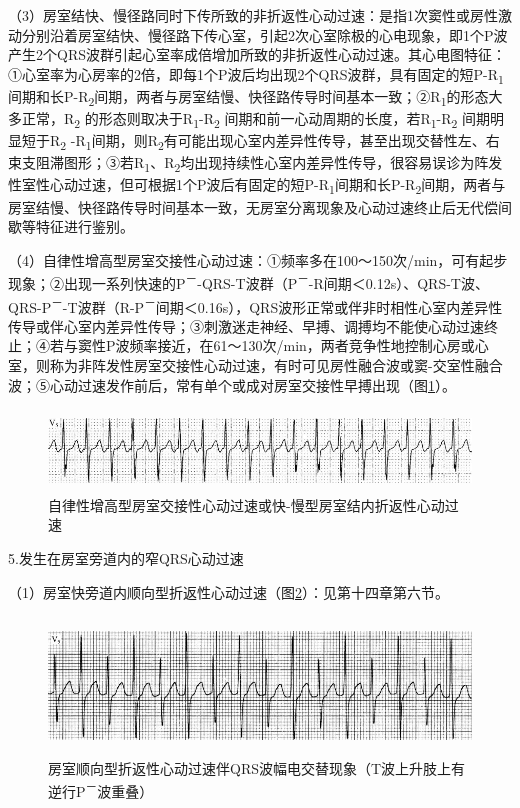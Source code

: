 （3）房室结快、慢径路同时下传所致的非折返性心动过速：是指1次窦性或房性激动分别沿着房室结快、慢径路下传心室，引起2次心室除极的心电现象，即1个P波产生2个QRS波群引起心室率成倍增加所致的非折返性心动过速。其心电图特征：①心室率为心房率的2倍，即每1个P波后均出现2个QRS波群，具有固定的短P-R\textsubscript{1}间期和长P-R\textsubscript{2}间期，两者与房室结慢、快径路传导时间基本一致；②R\textsubscript{1}的形态大多正常，R\textsubscript{2} 的形态则取决于R\textsubscript{1}-R\textsubscript{2} 间期和前一心动周期的长度，若R\textsubscript{1}-R\textsubscript{2} 间期明显短于R\textsubscript{2} -R\textsubscript{1}间期，则R\textsubscript{2}有可能出现心室内差异性传导，甚至出现交替性左、右束支阻滞图形；③若R\textsubscript{1}、R\textsubscript{2}均出现持续性心室内差异性传导，很容易误诊为阵发性室性心动过速，但可根据1个P波后有固定的短P-R\textsubscript{1}间期和长P-R\textsubscript{2}间期，两者与房室结慢、快径路传导时间基本一致，无房室分离现象及心动过速终止后无代偿间歇等特征进行鉴别。

（4）自律性增高型房室交接性心动过速：①频率多在100～150次/min，可有起步现象；②出现一系列快速的P\textsuperscript{－}-QRS-T波群（P\textsuperscript{－}-R间期＜0.12s）、QRS-T波、QRS-P\textsuperscript{－}-T波群（R-P\textsuperscript{－}间期＜0.16s），QRS波形正常或伴非时相性心室内差异性传导或伴心室内差异性传导；③刺激迷走神经、早搏、调搏均不能使心动过速终止；④若与窦性P波频率接近，在61～130次/min，两者竞争性地控制心房或心室，则称为非阵发性房室交接性心动过速，有时可见房性融合波或窦-交室性融合波；⑤心动过速发作前后，常有单个或成对房室交接性早搏出现（图\ref{fig32-10}）。

\begin{figure}[!htbp]
 \centering
 \includegraphics[width=5.58333in,height=0.85417in]{./images/Image00526.jpg}
 \captionsetup{justification=centering}
 \caption{自律性增高型房室交接性心动过速或快-慢型房室结内折返性心动过速}
 \label{fig32-10}
  \end{figure} 

5.发生在房室旁道内的窄QRS心动过速

（1）房室快旁道内顺向型折返性心动过速（图\ref{fig32-11}）：见第十四章第六节。

\begin{figure}[!htbp]
 \centering
 \includegraphics[width=5.58333in,height=1.4375in]{./images/Image00527.jpg}
 \captionsetup{justification=centering}
 \caption{房室顺向型折返性心动过速伴QRS波幅电交替现象（T波上升肢上有逆行P\textsuperscript{－}波重叠）}
 \label{fig32-11}
  \end{figure} 


